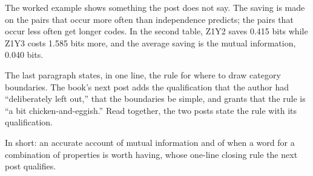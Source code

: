 \begin{afterword}
The worked example shows something the post does not say. The saving is made on the pairs that occur more often than independence predicts; the pairs that occur less often get longer codes. In the second table, Z1Y2 saves 0.415 bits while Z1Y3 costs 1.585 bits more, and the average saving is the mutual information, 0.040 bits.

The last paragraph states, in one line, the rule for where to draw category boundaries. The book's next post adds the qualification that the author had ``deliberately left out,'' that the boundaries be simple, and grants that the rule is ``a bit chicken-and-eggish.'' Read together, the two posts state the rule with its qualification.

In short: an accurate account of mutual information and of when a word for a combination of properties is worth having, whose one-line closing rule the next post qualifies.
\end{afterword}
